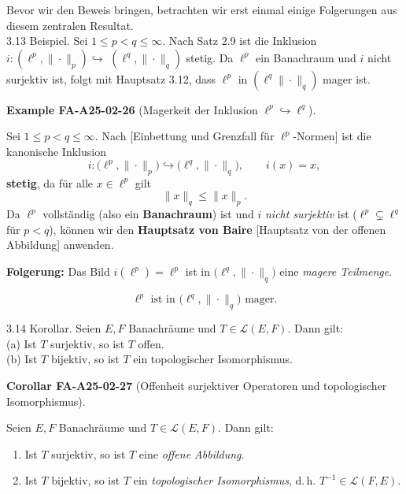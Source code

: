 \documentclass[10pt, letterpaper]{article}
\newcommand{\CustomHeading}[3]{%
  \par\medskip\noindent%
  \textbf{#1 #2} \textnormal{(#3)}.\enskip%
}
\newenvironment{KORO}[2]{\begin{unitbox}\CustomHeading{Corollar}{#1}{#2}}{\end{unitbox}}
\newenvironment{EXA}[2]{\begin{unitbox}\CustomHeading{Example}{#1}{#2}}{\end{unitbox}}
\begin{document}
Bevor wir den Beweis bringen, betrachten wir erst einmal einige Folgerungen aus diesem zentralen Resultat.\\


3.13 Beispiel. Sei $1 \leq p<q \leq \infty$. Nach Satz 2.9 ist die Inklusion $i:\left(\ell^{p},\|\cdot\|_{p}\right) \hookrightarrow$ $\left(\ell^{q},\|\cdot\|_{q}\right)$ stetig. Da $\ell^{p}$ ein Banachraum und $i$ nicht surjektiv ist, folgt mit Hauptsatz 3.12, dass $\ell^{p}$ in $\left(\ell^{q}\|\cdot\|_{q}\right)$ mager ist.



\begin{EXA}{FA-A25-02-26}{Magerkeit der Inklusion $\ell^p \hookrightarrow \ell^q$}
Sei $1 \leq p < q \leq \infty$.  
Nach [Einbettung und Grenzfall für $\ell^p$-Normen] ist die kanonische Inklusion
\[
i:\bigl(\ell^{p},\|\cdot\|_{p}\bigr)\hookrightarrow \bigl(\ell^{q},\|\cdot\|_{q}\bigr), 
\qquad i(x)=x,
\]
\textbf{stetig}, da für alle $x\in\ell^{p}$ gilt
\[
\|x\|_{q} \le \|x\|_{p}.
\]
Da $\ell^{p}$ vollständig (also ein \textbf{Banachraum}) ist und $i$ \emph{nicht surjektiv} ist
($\ell^{p}\subsetneq \ell^{q}$ für $p<q$), können wir den \textbf{Hauptsatz von Baire} 
[Hauptsatz von der offenen Abbildung] anwenden.

\medskip
\textbf{Folgerung:}  
Das Bild $i(\ell^{p})=\ell^{p}$ ist in $\bigl(\ell^{q},\|\cdot\|_{q}\bigr)$ eine 
\emph{magere Teilmenge}.  

\[
\boxed{\ell^{p} \text{ ist in } \bigl(\ell^{q},\|\cdot\|_{q}\bigr) \text{ mager.}}
\]
\end{EXA}



3.14 Korollar. Seien $E, F$ Banachräume und $T \in \mathcal{L}(E, F)$. Dann gilt:\\
(a) Ist $T$ surjektiv, so ist $T$ offen.\\
(b) Ist $T$ bijektiv, so ist $T$ ein topologischer Isomorphismus.


\begin{KORO}{FA-A25-02-27}{Offenheit surjektiver Operatoren und topologischer Isomorphismus}
Seien $E,F$ Banachräume und $T\in\mathcal{L}(E,F)$. Dann gilt:
\begin{enumerate}[label=(\alph*)]
\item Ist $T$ surjektiv, so ist $T$ eine \emph{offene Abbildung}.
\item Ist $T$ bijektiv, so ist $T$ ein \emph{topologischer Isomorphismus}, d.\,h. $T^{-1}\in\mathcal{L}(F,E)$.
\end{enumerate}
\end{KORO}
\end{document}
